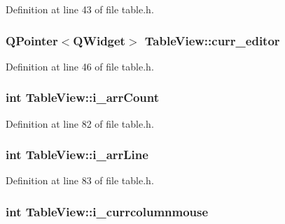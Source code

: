 Definition at line 43 of file table.h.

\hypertarget{classTableView_a294454aaf1b1d44841f39bc28527d93c}{
\subsubsection[{curr\_\-editor}]{\setlength{\rightskip}{0pt plus 5cm}QPointer$<$QWidget$>$ {\bf TableView::curr\_\-editor}}}
\label{classTableView_a294454aaf1b1d44841f39bc28527d93c}


Definition at line 46 of file table.h.

\hypertarget{classTableView_a6624fcee6052dd850b9437ed02ed27d8}{
\subsubsection[{i\_\-arrCount}]{\setlength{\rightskip}{0pt plus 5cm}int {\bf TableView::i\_\-arrCount}}}
\label{classTableView_a6624fcee6052dd850b9437ed02ed27d8}


Definition at line 82 of file table.h.

\hypertarget{classTableView_a1f1333ce0ba4e23da60de63d9324d522}{
\subsubsection[{i\_\-arrLine}]{\setlength{\rightskip}{0pt plus 5cm}int {\bf TableView::i\_\-arrLine}}}
\label{classTableView_a1f1333ce0ba4e23da60de63d9324d522}


Definition at line 83 of file table.h.

\hypertarget{classTableView_a7b47dd87b8a2bcd86d413c2f19402429}{
\subsubsection[{i\_\-currcolumnmouse}]{\setlength{\rightskip}{0pt plus 5cm}int {\bf TableView::i\_\-currcolumnmouse}}}
\label{classTableView_a7b47dd87b8a2bcd86d413c2f19402429}


